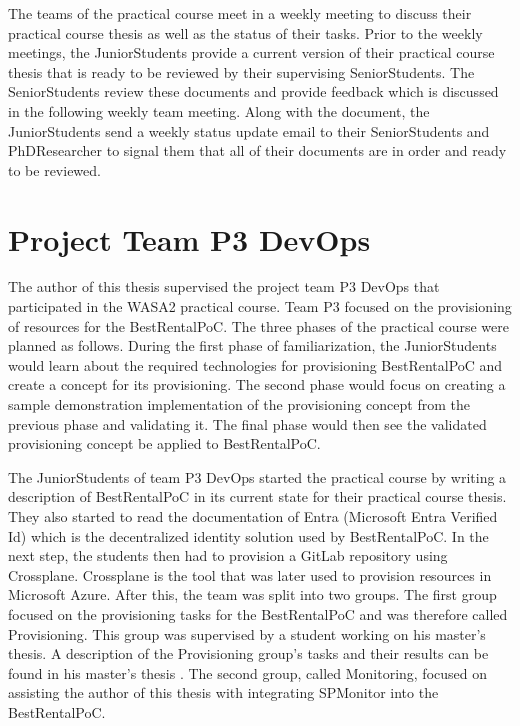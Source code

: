 The teams of the practical course meet in a weekly meeting to discuss their practical course
thesis as well as the status of their tasks. Prior to the weekly meetings, the JuniorStudents
provide a current version of their practical course thesis that is ready to be reviewed
by their supervising SeniorStudents. The SeniorStudents review these documents and provide
feedback which is discussed in the following weekly team meeting. Along with the document,
the JuniorStudents send a weekly status update email to their SeniorStudents and PhDResearcher
to signal them that all of their documents are in order and ready to be reviewed.

\section{Project Team P3 DevOps}
\label{sec:p3}

The author of this thesis supervised the project team P3 DevOps that participated in the
WASA2 practical course. Team P3 focused on the provisioning of resources for the BestRentalPoC.
The three phases of the practical course were planned as follows.
During the first phase of familiarization, the JuniorStudents would learn about the required
technologies for provisioning BestRentalPoC and create a concept for its provisioning.
The second phase would focus on creating a sample demonstration implementation
of the provisioning concept from the previous phase and validating it.
The final phase would then see the validated provisioning concept be applied to BestRentalPoC.

The JuniorStudents of team P3 DevOps started the practical course by writing a description
of BestRentalPoC in its current state for their practical course thesis. They also started
to read the documentation of Entra (Microsoft Entra Verified Id) which is the decentralized identity
solution used by BestRentalPoC. In the next step, the students then had to provision
a GitLab repository using Crossplane. Crossplane is the tool that was later used to provision
resources in Microsoft Azure. After this, the team was split into two groups.
The first group focused on the provisioning tasks for the BestRentalPoC and was therefore called Provisioning.
This group was supervised by a student working on his master's thesis. A description
of the Provisioning group's tasks and their results can be found in his master's thesis \cite{Go23}.
The second group, called Monitoring, focused on assisting the author of this thesis with integrating SPMonitor into the BestRentalPoC.

